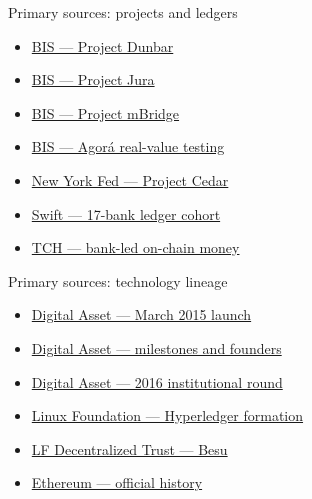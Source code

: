\documentclass[aspectratio=169,12pt]{beamer}
\newcommand{\verytightitems}{\setlength{\itemsep}{0.22em}\setlength{\parskip}{0pt}}
\begin{document}
\begin{frame}{Primary sources: projects and ledgers}
  \fontsize{8.1}{9.7}\selectfont
  \begin{itemize}\verytightitems
    \item \href{https://www.bis.org/publ/othp47.htm}{BIS --- Project Dunbar}
    \item \href{https://www.bis.org/publ/othp44.htm}{BIS --- Project Jura}
    \item \href{https://www.bis.org/about/bisih/topics/cbdc/mcbdc_bridge.htm}{BIS --- Project mBridge}
    \item \href{https://www.bis.org/about/bisih/topics/fmis/agora/rvt.htm}{BIS --- Agor\'a real-value testing}
    \item \href{https://www.newyorkfed.org/aboutthefed/nyic/project-cedar}{New York Fed --- Project Cedar}
    \item \href{https://www.swift.com/news-events/press-releases/swifts-blockchain-ledger-ready-use-17-banks-set-pioneer-tokenised-cross-border-payments-trusted-global-infrastructure}{Swift --- 17-bank ledger cohort}
    \item \href{https://www.theclearinghouse.org/payment-systems/Articles/2026/06/Major-Financial-Institutions-Unveil-Bank-Led-On-Chain-Money-Initiative}{TCH --- bank-led on-chain money}
  \end{itemize}
\end{frame}

\begin{frame}{Primary sources: technology lineage}
  \fontsize{8.1}{9.7}\selectfont
  \begin{itemize}\verytightitems
    \item \href{https://www.prnewswire.com/news-releases/digital-asset-holdings-delivers-first-of-its-kind-technology-to-bridge-the-gap-between-crypto-and-mainstream-assets-300048767.html}{Digital Asset --- March 2015 launch}
    \item \href{https://www.digitalasset.com/about}{Digital Asset --- milestones and founders}
    \item \href{https://www.broadridge.com/press-release/2016/digital-asset-closes-funding-round-exceeding-50-million}{Digital Asset --- 2016 institutional round}
    \item \href{https://www.lfdecentralizedtrust.org/announcements/2015/12/17/linux-foundation-unites-industry-leaders-to-advance-blockchain-technology}{Linux Foundation --- Hyperledger formation}
    \item \href{https://www.lfdecentralizedtrust.org/projects/besu}{LF Decentralized Trust --- Besu}
    \item \href{https://ethereum.org/en/ethereum-history-founder-and-ownership/}{Ethereum --- official history}
  \end{itemize}
\end{frame}
\end{document}
